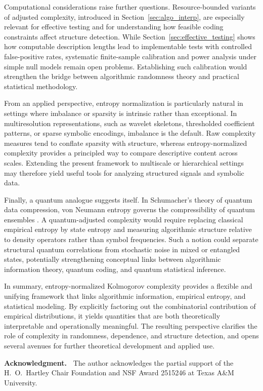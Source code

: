 \documentclass[12pt]{article}
\begin{document}
Computational considerations raise further questions. Resource-bounded variants
of adjusted complexity, introduced in Section~\ref{sec:algo_interp}, are
especially relevant for effective testing and for understanding how feasible
coding constraints affect structure detection. While Section~\ref{sec:effective_testing}
shows how computable description lengths lead to implementable tests with
controlled false-positive rates, systematic finite-sample calibration and power
analysis under simple null models remain open problems. Establishing such
calibration would strengthen the bridge between algorithmic randomness theory
and practical statistical methodology.

From an applied perspective, entropy normalization is particularly natural in
settings where imbalance or sparsity is intrinsic rather than exceptional. In
multiresolution representations, such as wavelet skeletons, thresholded
coefficient patterns, or sparse symbolic encodings, imbalance is the default.
Raw complexity measures tend to conflate sparsity with structure, whereas
entropy-normalized complexity provides a principled way to compare descriptive
content across scales. Extending the present framework to multiscale or
hierarchical settings may therefore yield useful tools for analyzing structured
signals and symbolic data.

Finally, a quantum analogue suggests itself. In Schumacher’s theory of quantum
data compression, von Neumann entropy governs the compressibility of quantum
ensembles \citep{Schumacher1995QuantumCoding}. A quantum-adjusted complexity
would require replacing classical empirical entropy by state entropy and
measuring algorithmic structure relative to density operators rather than
symbol frequencies. Such a notion could separate structural quantum correlations
from stochastic noise in mixed or entangled states, potentially strengthening
conceptual links between algorithmic information theory, quantum coding, and
quantum statistical inference.

In summary, entropy-normalized Kolmogorov complexity provides a flexible and
unifying framework that links algorithmic information, empirical entropy, and
statistical modeling. By explicitly factoring out the combinatorial contribution
of empirical distributions, it yields quantities that are both theoretically
interpretable and operationally meaningful. The resulting perspective clarifies
the role of complexity in randomness, dependence, and structure detection, and
opens several avenues for further theoretical development and applied use.




\medskip

\noindent
{\bf Acknowledgment.~} The author acknowledges the partial support of the H.\ O.\ Hartley Chair Foundation and NSF Award 2515246 at Texas A\&M University.


\end{document}
